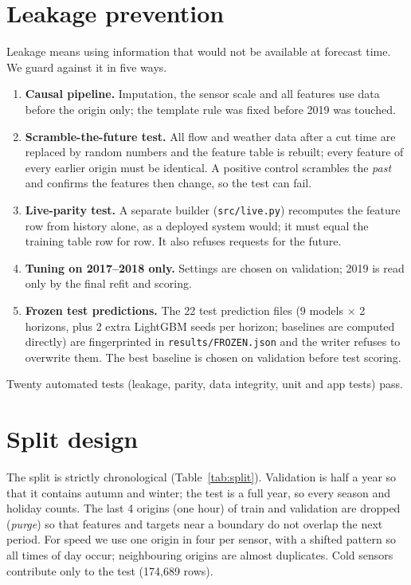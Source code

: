 ﻿\documentclass[11pt,a4paper]{article}
\newcommand{\code}[1]{\texttt{#1}}
\begin{document}
\section{Leakage prevention}
Leakage means using information that would not be available at forecast time. We guard against it in five ways.
\begin{enumerate}
\item \textbf{Causal pipeline.} Imputation, the sensor scale and all features use data before the origin only; the template rule was fixed before 2019 was touched.
\item \textbf{Scramble-the-future test.} All flow and weather data after a cut time are replaced by random numbers and the feature table is
rebuilt; every feature of every earlier origin must be identical. A positive control scrambles the \emph{past} and confirms the features then change, so the test can fail.
\item \textbf{Live-parity test.} A separate builder (\code{src/live.py}) recomputes the feature row from history alone, as a deployed system would; it must equal the training table row for row. It also refuses requests for the future.
\item \textbf{Tuning on 2017--2018 only.} Settings are chosen on validation; 2019 is read only by the final refit and scoring.
\item \textbf{Frozen test predictions.} The 22 test prediction files (9 models $\times$ 2 horizons, plus 2 extra LightGBM seeds per horizon; baselines are computed directly) are fingerprinted in \code{results/FROZEN.json} and the writer refuses to overwrite them. The best baseline is chosen on validation before test scoring.
\end{enumerate}
Twenty automated tests (leakage, parity, data integrity, unit and app tests) pass.

\section{Split design}
The split is strictly chronological (Table~\ref{tab:split}). Validation is half a year so that it contains autumn and winter; the test is a full year,
so every season and holiday counts. The last 4 origins (one hour) of train and validation are dropped (\emph{purge}) so that features and targets near a
boundary do not overlap the next period. For speed we use one origin in four per sensor, with a shifted pattern so all times of day occur; neighbouring
origins are almost duplicates. Cold sensors contribute only to the test (174,689 rows).
\end{document}
